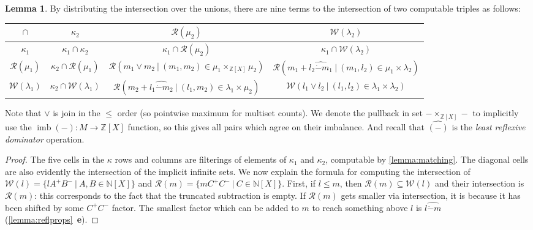 \documentclass{article}
\theoremstyle{definition}
\newtheorem{lemma}{Lemma}[section]
\newcommand{\N}{\mathbb{N}}
\newcommand{\Z}{\mathbb{Z}}
\newcommand{\cR}{\mathcal{R}}
\newcommand{\cW}{\mathcal{W}}
\newcommand{\monus}{\mathbin{\dot-}}
\newcommand{\imb}{\operatorname{imb}}
\begin{document}
\begin{lemma}
    \label{lemma:tripleintersectbin}
    By distributing the intersection over the unions, there are nine terms to the intersection of two computable triples as follows: 
    \begin{center}
    \begin{tabular}{||c||c|c|c||}
        \hline
        $\cap$ & $\kappa_2$ & $\cR(\mu_2)$ & $\cW(\lambda_2)$\\
        \hline\hline
        $\kappa_1$ & $\kappa_1\cap \kappa_2$ & $\kappa_1\cap \cR(\mu_2)$  & $\kappa_1\cap \cW(\lambda_2)$ \\
        \hline
        $\cR(\mu_1)$ & $\kappa_2\cap \cR(\mu_1)$ & $\cR(m_1\vee m_2\ |\ (m_1,m_2)\in \mu_1 \times_{\Z[X]} \mu_2)$ & $\cR(m_1 + \widehat{l_2\monus m_1}\ |\ (m_1,l_2)\in \mu_1 \times \lambda_2)$ \\
        \hline
        $\cW(\lambda_1)$ & $\kappa_2\cap \cW(\lambda_1)$ & $\cR(m_2 + \widehat{l_1\monus m_2}\ |\ (l_1,m_2)\in \lambda_1 \times \mu_2)$ & $\cW(l_1\vee l_2\ |\ (l_1,l_2)\in \lambda_1 \times \lambda_2)$ \\
        \hline
    \end{tabular}
    \end{center}

    Note that $\vee$ is join in the $\leq$ order (so pointwise maximum for multiset counts). We denote the pullback in set $-\times_{\Z[X]} -$ to implicitly use the $\imb(-)\colon M \to \Z[X]$ function, so this gives all pairs which agree on their imbalance. And recall that $\widehat{(-)}$ is the {\it least reflexive dominator} operation.
    
\end{lemma}
\begin{proof}

    The five cells in the $\kappa$ rows and columns are filterings of elements of $\kappa_1$ and $\kappa_2$, computable by \cref{lemma:matching}. The diagonal cells are also evidently the intersection of the implicit infinite sets. We now explain the formula for computing the intersection of $\cW(l)=\{lA^+B^-\ |\ A,B\in \N[X]\}$ and $\cR(m)=\{mC^+C^-\ |\ C \in \N[X]\}$. First, if $l\leq m$, then $\cR(m)\subseteq \cW(l)$ and their intersection is $\cR(m)$: this corresponds to the fact that the truncated subtraction is empty. If $\cR(m)$ gets smaller via intersection, it is because it has been shifted by some $C^+C^-$ factor. The smallest factor which can be added to $m$ to reach something above $l$ is $\widehat{l\monus m}$ (\cref{lemma:reflprops}~{\bf e}).
\end{proof}
\end{document}
